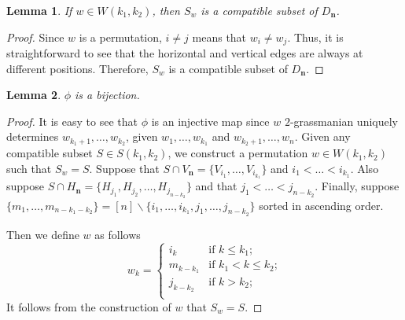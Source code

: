 \documentclass{amsart}
\newtheorem{lma}{Lemma}
\newcommand{\bfn}{\mathbf{n}}
\begin{document}



\begin{lma}\label{lma:mapCompat}
If $w\in W(k_1,k_2)$, then $S_w$ is a compatible subset of $D_\bfn$.
\end{lma}
\begin{proof}
Since $w$ is a permutation, $i\neq j$ means that $w_i\neq w_j$. Thus, it is straightforward to see that the horizontal and vertical edges are always at different positions. Therefore, $S_w$ is a compatible subset of $D_\bfn$.
\end{proof}

\begin{lma}\label{lma:bij}
$\phi$ is a bijection.
\end{lma}
\begin{proof}
It is easy to see that $\phi$ is an injective map since $w$ $2$-grassmanian uniquely determines $w_{k_1+1},\ldots,w_{k_2}$, given $w_{1},\ldots,w_{k_1}$ and $w_{k_2+1},\ldots,w_{n}$. Given any compatible subset $S\in S(k_1,k_2)$, we construct a permutation $w\in W(k_1,k_2)$ such that $S_w=S$. Suppose that $S\cap V_\bfn = \{V_{i_1},\ldots,V_{i_{k_1}} \}$ and $i_1<\ldots<i_{k_1}$. Also suppose $S\cap H_\bfn=\{ H_{j_1},H_{j_2},\ldots, H_{j_{n-k_2}} \}$ and that $j_1<\ldots<j_{n-k_2}$. Finally, suppose $\{m_1, \ldots,m_{n-k_1-k_2}\} = [n]\backslash \{i_1,\ldots,i_{k_1},j_1,\ldots,j_{n-k_2} \}$ sorted in ascending order.

Then we define $w$ as follows
\[
w_k= 
\begin{cases}
  i_k & \text{if $k\leq k_1$};\\
  m_{k-k_1} & \text{if $k_1< k \leq k_2 $;}\\
  j_{k-k_2} & \text{if $k > k_2 $;}\\
\end{cases}
\]
It follows from the construction of $w$ that $S_{w}=S$.
\end{proof}
\end{document}
